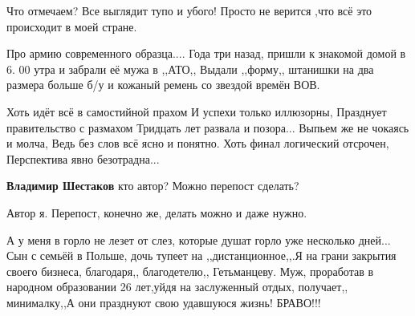 \begin{itemize}
Что отмечаем? Все выглядит тупо и убого! Просто не верится ,что всё это происходит в моей стране.

 

Про армию современного образца.... Года три назад, пришли к знакомой домой в 6. 00
утра и забрали её мужа в ,,АТО,, Выдали ,,форму,, штанишки на два размера больше
б/у и кожаный ремень со звездой времён ВОВ.


\obeycr
Хоть идёт всё в самостийной прахом
И успехи только иллюзорны,
Празднует правительство с размахом
Тридцать лет развала и позора...
Выпьем же не чокаясь и молча,
Ведь без слов всё ясно и понятно.
Хоть финал логический отсрочен,
Перспектива явно безотрадна...
\restorecr

\begin{itemize}
 
\textbf{Владимир Шестаков} кто автор? Можно перепост сделать?

 
Автор я. Перепост, конечно же, делать можно и даже нужно.

 

А у меня в горло не лезет от слез, которые душат горло уже несколько дней...
Сын с семьёй в Польше, дочь тупеет на ,,дистанционное,,.Я на грани закрытия
своего бизнеса, благодаря,, благодетелю,, Гетьманцеву. Муж, проработав в
народном образовании 26 лет,уйдя на заслуженный отдых, получает,, минималку,,А
они празднуют свою удавшуюся жизнь! БРАВО!!!
\end{itemize}


\end{itemize}
